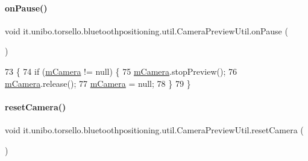 \paragraph{\texorpdfstring{on\+Pause()}{onPause()}}
{\footnotesize\ttfamily void it.\+unibo.\+torsello.\+bluetoothpositioning.\+util.\+Camera\+Preview\+Util.\+on\+Pause (\begin{DoxyParamCaption}{ }\end{DoxyParamCaption})}


\begin{DoxyCode}
73                           \{
74         \textcolor{keywordflow}{if} (\hyperlink{classit_1_1unibo_1_1torsello_1_1bluetoothpositioning_1_1util_1_1CameraPreviewUtil_a7ee402da8ec64412f9a68e68b4025eea_a7ee402da8ec64412f9a68e68b4025eea}{mCamera} != null) \{
75             \hyperlink{classit_1_1unibo_1_1torsello_1_1bluetoothpositioning_1_1util_1_1CameraPreviewUtil_a7ee402da8ec64412f9a68e68b4025eea_a7ee402da8ec64412f9a68e68b4025eea}{mCamera}.stopPreview();
76             \hyperlink{classit_1_1unibo_1_1torsello_1_1bluetoothpositioning_1_1util_1_1CameraPreviewUtil_a7ee402da8ec64412f9a68e68b4025eea_a7ee402da8ec64412f9a68e68b4025eea}{mCamera}.release();
77             \hyperlink{classit_1_1unibo_1_1torsello_1_1bluetoothpositioning_1_1util_1_1CameraPreviewUtil_a7ee402da8ec64412f9a68e68b4025eea_a7ee402da8ec64412f9a68e68b4025eea}{mCamera} = null;
78         \}
79     \}
\end{DoxyCode}
\hypertarget{classit_1_1unibo_1_1torsello_1_1bluetoothpositioning_1_1util_1_1CameraPreviewUtil_a5240e32d2ccac682cf80c639accea5da_a5240e32d2ccac682cf80c639accea5da}{}\label{classit_1_1unibo_1_1torsello_1_1bluetoothpositioning_1_1util_1_1CameraPreviewUtil_a5240e32d2ccac682cf80c639accea5da_a5240e32d2ccac682cf80c639accea5da} 
\paragraph{\texorpdfstring{reset\+Camera()}{resetCamera()}}
{\footnotesize\ttfamily void it.\+unibo.\+torsello.\+bluetoothpositioning.\+util.\+Camera\+Preview\+Util.\+reset\+Camera (\begin{DoxyParamCaption}{ }\end{DoxyParamCaption})}



